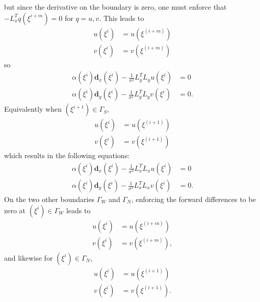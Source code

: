 but since the derivative on the boundary is zero, one must enforce that $-L_x^Tq(\xi^{i+m}) = 0$ for $q = u,v$. This leads to
\begin{align}
\label{neumann1}
u(\xi^i) &= u(\xi^{(i+m)})  \\
\label{neumann2}
v(\xi^i) &= v(\xi^{(i+m)}) 
\end{align}
 so
\begin{align*}
\alpha(\xi^i) \textbf{d}_x(\xi^i) - \frac{1}{\sigma^2} L_y^T L_y u(\xi^i) &= 0 \\
\alpha(\xi^i) \textbf{d}_y(\xi^i) - \frac{1}{\sigma^2} L_y^T L_y v(\xi^i)  &= 0.
\end{align*}
Equivalently when $(\xi^{i+1}) \in \Gamma_S$,
\begin{align}
\label{neumann3}
u(\xi^i) &= u(\xi^{(i+1)})  \\
\label{neumann4}
v(\xi^i) &= v(\xi^{(i+1)}) 
\end{align}
which results in the following equations:
\begin{align*}
\alpha(\xi^i) \textbf{d}_x(\xi^i) - \frac{1}{\sigma^2} L_x^T L_x u(\xi^i) &= 0 \\
\alpha(\xi^i) \textbf{d}_y(\xi^i) - \frac{1}{\sigma^2} L_x^T L_x v(\xi^i) &= 0.
\end{align*}
On the two other boundaries $\Gamma_W$ and $\Gamma_N$, enforcing the forward differences to be zero at $(\xi^i) \in \Gamma_W$ leads to
\begin{align}
\label{neumann5}
u(\xi^i) &= u(\xi^{(i+m)})  \\
\label{neumann6}
v(\xi^i) &= v(\xi^{(i+m)}), 
\end{align}
and likewise for $(\xi^i) \in \Gamma_N$,
\begin{align}
\label{neumann7}
u(\xi^i) &= u(\xi^{(i+1)})  \\
\label{neumann8}
v(\xi^i) &= v(\xi^{(i+1)}).
\end{align}


